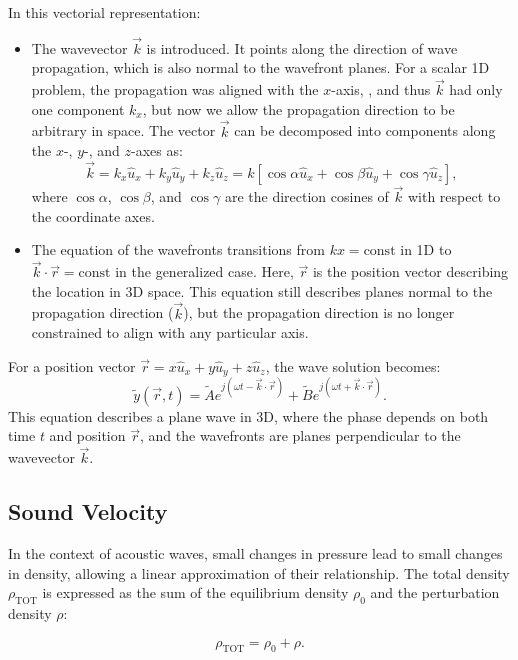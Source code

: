 \documentclass[a4paper]{article}
\begin{document}
In this vectorial representation:
\begin{itemize}
    \item  The wavevector \(\vec{k}\) is introduced. It points along the direction of wave propagation, which is also normal to the wavefront planes. For a scalar 1D problem, the propagation was aligned with the \(x\)-axis, , and thus \(\vec{k}\) had only one component \(k_x\), but now we allow the propagation direction to be arbitrary in space.
    The vector \(\vec{k}\) can be decomposed into components along the \(x\)-, \(y\)-, and \(z\)-axes as:
\[
\vec{k} = k_x \hat{u}_x + k_y \hat{u}_y + k_z \hat{u}_z = k \left[\cos\alpha \hat{u}_x + \cos\beta \hat{u}_y + \cos\gamma \hat{u}_z\right],
\]
where \(\cos\alpha\), \(\cos\beta\), and \(\cos\gamma\) are the direction cosines of \(\vec{k}\) with respect to the coordinate axes.

\item The equation of the wavefronts transitions from \(kx = \text{const}\) in 1D to \(\vec{k} \cdot \vec{r} = \text{const}\) in the generalized case. Here, \(\vec{r}\) is the position vector describing the location in 3D space. This equation still describes planes normal to the propagation direction (\(\vec{k}\)), but the propagation direction is no longer constrained to align with any particular axis.
\end{itemize}



For a position vector \(\vec{r} = x\hat{u}_x + y\hat{u}_y + z\hat{u}_z\), the wave solution becomes:
\[
\tilde{y}(\vec{r}, t) = \tilde{A} e^{j(\omega t - \vec{k} \cdot \vec{r})} + \tilde{B} e^{j(\omega t + \vec{k} \cdot \vec{r})}.
\]
This equation describes a plane wave in 3D, where the phase depends on both time \(t\) and position \(\vec{r}\), and the wavefronts are planes perpendicular to the wavevector \(\vec{k}\).

\subsection{Sound Velocity}



In the context of acoustic waves, small changes in pressure lead to small changes in density, allowing a linear approximation of their relationship. The total density \(\rho_\text{TOT}\) is expressed as the sum of the equilibrium density \(\rho_0\) and the perturbation density \(\rho\): 

\[
\rho_\text{TOT} = \rho_0 + \rho.
\]
\end{document}
